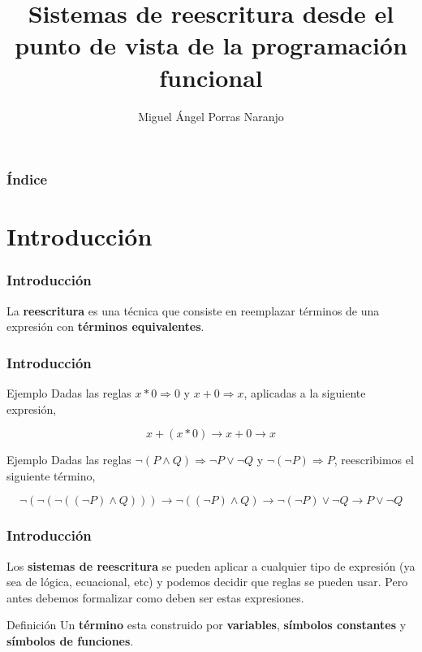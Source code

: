 \documentclass{beamer}
\title[Sistemas de reescritura]{Sistemas de reescritura desde el punto
  de vista de la programación funcional}
\author[Miguel Ángel Porras Naranjo]{Miguel Ángel Porras Naranjo}
\institute[Dpto. Ciencias de la Computación e Inteligencia
Artificial]{Tutorizado por José Antonio Alonso y María José Hidalgo}
\begin{document}
\lstset{language=Haskell}
\frame{\titlepage}

\begin{frame}
  \frametitle{Índice}
  \tableofcontents
\end{frame}

\section{Introducción}

\begin{frame}
  \frametitle{Introducción}

  \begin{block}{}
    La \textbf{reescritura} es una técnica que consiste en reemplazar
    términos de una expresión con \textbf{términos equivalentes}.
  \end{block}
\end{frame}

\begin{frame}
  \frametitle{Introducción}
  \begin{block}{Ejemplo}
    Dadas las reglas $x * 0 \Rightarrow 0$ y $x+0 \Rightarrow x$,
    aplicadas a la siguiente expresión,

    \[x +(x*0) \longrightarrow x+0 \longrightarrow x \]
  \end{block}

  \begin{block}{Ejemplo}
    Dadas las reglas
    $\neg (P \wedge Q) \Rightarrow \neg P \vee \neg Q$ y
    $\neg (\neg P) \Rightarrow P$, reescribimos el siguiente término,

    \[\neg (\neg (\neg ((\neg P) \wedge Q))) \longrightarrow \neg
      ((\neg P) \wedge Q) \longrightarrow \neg (\neg P) \vee \neg Q
      \longrightarrow P \vee \neg Q\]
  \end{block}
\end{frame}

\begin{frame}
  \frametitle{Introducción}
  \begin{block}{}
    Los \textbf{sistemas de reescritura} se pueden aplicar a cualquier
    tipo de expresión (ya sea de lógica, ecuacional, etc) y podemos
    decidir que reglas se pueden usar. Pero antes debemos formalizar
    como deben ser estas expresiones.
  \end{block}

  \begin{block}{Definición}
    Un \textbf{término} esta construido por \textbf{variables},
    \textbf{símbolos constantes} y \textbf{símbolos de funciones}.
  \end{block}
\end{frame}
\end{document}
